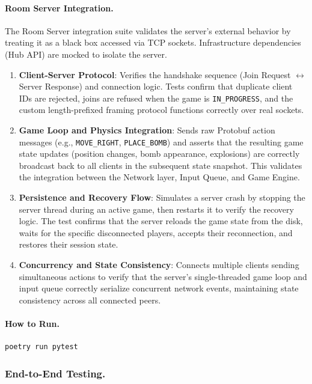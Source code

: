 \paragraph{Room Server Integration.}

The Room Server integration suite validates the server's external behavior by treating it as a black box accessed via TCP sockets.
Infrastructure dependencies (Hub API) are mocked to isolate the server.
\begin{enumerate}
    \item \textbf{Client-Server Protocol}: Verifies the handshake sequence (Join Request $\leftrightarrow$ Server Response) and connection logic.
          Tests confirm that duplicate client IDs are rejected, joins are refused when the game is \texttt{IN\_PROGRESS}, and the custom length-prefixed framing protocol functions correctly over real sockets.
    \item \textbf{Game Loop and Physics Integration}: Sends raw Protobuf action messages (e.g., \texttt{MOVE\_RIGHT}, \texttt{PLACE\_BOMB}) and asserts that the resulting game state updates (position changes, bomb appearance, explosions) are correctly broadcast back to all clients in the subsequent state snapshot. This validates the integration between the Network layer, Input Queue, and Game Engine.

    \item \textbf{Persistence and Recovery Flow}: Simulates a server crash by stopping the server thread during an active game, then restarts it to verify the recovery logic. The test confirms that the server reloads the game state from the disk, waits for the specific disconnected players, accepts their reconnection, and restores their session state.

    \item \textbf{Concurrency and State Consistency}: Connects multiple clients sending simultaneous actions to verify that the server's single-threaded game loop and input queue correctly serialize concurrent network events, maintaining state consistency across all connected peers.
\end{enumerate}

\paragraph{How to Run.}
\begin{verbatim}
poetry run pytest
\end{verbatim}

\subsubsection{End-to-End Testing.}

